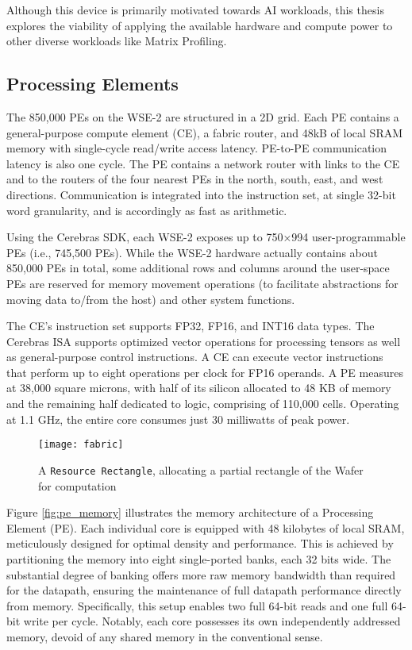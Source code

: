 Although this device is primarily motivated towards AI workloads, this thesis explores the viability of applying the available hardware and compute power to other diverse workloads like Matrix Profiling.

\subsection{Processing Elements} \label{subsection:pe}

The 850,000 PEs on the WSE-2 are structured in a 2D grid. Each PE contains a general-purpose compute element (CE), a fabric router, and 48kB of local SRAM memory with single-cycle read/write access latency. PE-to-PE communication latency is also one cycle. The PE contains a network router with links to the CE and to the routers of the four nearest PEs in the north, south, east, and west directions. Communication is integrated into the instruction set, at single 32-bit word granularity, and is accordingly as fast as arithmetic.

Using the Cerebras SDK, each WSE-2 exposes up to 750×994 user-programmable PEs (i.e., 745,500 PEs). While the WSE-2 hardware actually contains about 850,000 PEs in total, some additional rows and columns around the user-space PEs are reserved for memory movement operations (to facilitate abstractions for moving data to/from the host) and other system functions.

The CE's instruction set supports FP32, FP16, and INT16 data types. The Cerebras ISA supports optimized vector operations for processing tensors as well as general-purpose control instructions. A CE can execute vector instructions that perform up to eight operations per clock for FP16 operands. A PE measures at 38,000 square microns, with half of its silicon allocated to 48 KB of memory and the remaining half dedicated to logic, comprising of 110,000 cells. Operating at 1.1 GHz, the entire core consumes just 30 milliwatts of peak power.

\begin{figure}[h!]
    \texttt{[image: fabric]}
    \centering
    \caption{A \texttt{Resource Rectangle}, allocating a partial rectangle of the Wafer for computation}
    \label{fig:rectangle}
\end{figure}

Figure \ref{fig:pe_memory} illustrates the memory architecture of a Processing Element (PE). Each individual core is equipped with 48 kilobytes of local SRAM, meticulously designed for optimal density and performance. This is achieved by partitioning the memory into eight single-ported banks, each 32 bits wide. The substantial degree of banking offers more raw memory bandwidth than required for the datapath, ensuring the maintenance of full datapath performance directly from memory. Specifically, this setup enables two full 64-bit reads and one full 64-bit write per cycle. Notably, each core possesses its own independently addressed memory, devoid of any shared memory in the conventional sense.

